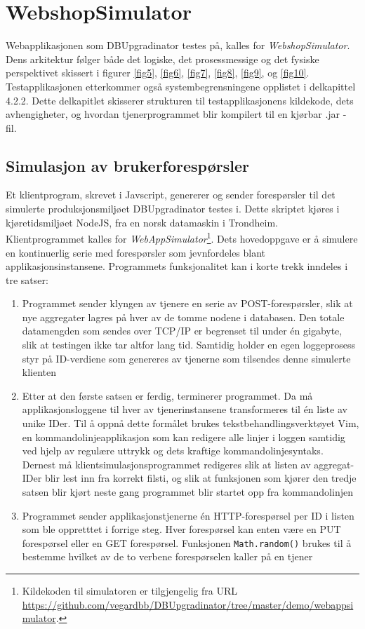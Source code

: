 \section{WebshopSimulator} \label{prog}

Webapplikasjonen som DBUpgradinator testes på, kalles for \emph{WebshopSimulator}. Dens arkitektur følger både det logiske, det prosessmessige og det fysiske perspektivet skissert i figurer \ref{fig5}, \ref{fig6}, \ref{fig7}, \ref{fig8}, \ref{fig9}, og \ref{fig10}. Testapplikasjonen etterkommer også systembegrensningene opplistet i delkapittel 4.2.2. Dette delkapitlet skisserer strukturen til testapplikasjonens kildekode, dets avhengigheter, og hvordan tjenerprogrammet blir kompilert til en kjørbar .jar - fil.

\subsection{Simulasjon av brukerforespørsler}

Et klientprogram, skrevet i Javscript, genererer og sender forespørsler til det simulerte produksjonsmiljøet DBUpgradinator testes i. Dette skriptet kjøres i kjøretidsmiljøet NodeJS, fra en norsk datamaskin i Trondheim. Klientprogrammet kalles for \emph{WebAppSimulator}\footnote{Kildekoden til simulatoren er tilgjengelig fra URL \url{https://github.com/vegardbb/DBUpgradinator/tree/master/demo/webappsimulator}.}. Dets hovedoppgave er å simulere en kontinuerlig serie med forespørsler som jevnfordeles blant applikasjonsinstansene. Programmets funksjonalitet kan i korte trekk inndeles i tre satser:

\begin{enumerate}
  \item Programmet sender klyngen av tjenere en serie av POST-forespørsler, slik at nye aggregater lagres på hver av de tomme nodene i databasen. Den totale datamengden som sendes over TCP/IP er begrenset til under én gigabyte, slik at testingen ikke tar altfor lang tid. Samtidig holder en egen loggeprosess styr på ID-verdiene som genereres av tjenerne som tilsendes denne simulerte klienten
  \item Etter at den første satsen er ferdig, terminerer programmet. Da må applikasjonsloggene til hver av tjenerinstansene transformeres til én liste av unike IDer. Til å oppnå dette formålet brukes tekstbehandlingsverktøyet Vim, en kommandolinjeapplikasjon som kan redigere alle linjer i loggen samtidig ved hjelp av regulære uttrykk og dets kraftige kommandolinjesyntaks. Dernest må klientsimulasjonsprogrammet redigeres slik at listen av aggregat-IDer blir lest inn fra korrekt filsti, og slik at funksjonen som kjører den tredje satsen blir kjørt neste gang programmet blir startet opp fra kommandolinjen
  \item Programmet sender applikasjonstjenerne én HTTP-forespørsel per ID i listen som ble oppretttet i forrige steg. Hver forespørsel kan enten være en PUT \- forespørsel eller en GET \- forespørsel. Funksjonen \texttt{Math.random()} brukes til å bestemme hvilket av de to verbene forespørselen kaller på en tjener
\end{enumerate}

